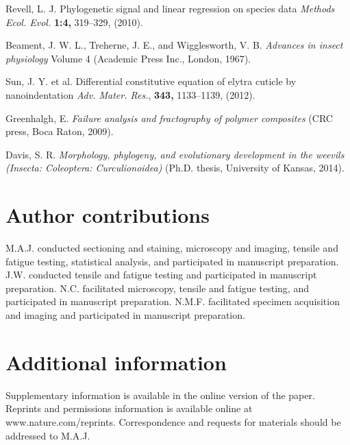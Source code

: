 \documentclass[twocolumn, linenumbers, superscriptaddress, nofootinbib]{revtex4-1}
\begin{document}
\begin{thebibliography}{50}
				Revell, L. J.
				Phylogenetic signal and linear regression on species data
				\textit{Methods Ecol. Evol.}
				\textbf{1:4,}
				319--329,
				(2010).
			
				Beament, J. W. L., Treherne, J. E., and Wigglesworth, V. B.
				\textit{Advances in insect physiology}
				Volume 4
				(Academic Press Inc.,
				London,
				1967).
			
				Sun, J. Y. et al.
				Differential constitutive equation of elytra cuticle by nanoindentation
				\textit{Adv. Mater. Res.},
				\textbf{343,}
				1133--1139,
				(2012).
			
				Greenhalgh, E.
				\textit{Failure analysis and fractography of polymer composites}
				(CRC press,
				Boca Raton,
				2009).
				
				Davis, S. R.
				\textit{Morphology, phylogeny, and evolutionary development in the	weevils (Insecta: Coleoptera: Curculionoidea)}
				(Ph.D. thesis,
				University of	Kansas,
				2014).
	\end{thebibliography}

	\begin{acknowledgements}
	\end{acknowledgements}

	\section*{Author contributions}
		M.A.J. conducted sectioning and staining, microscopy and imaging, tensile and fatigue testing, statistical analysis, and participated in manuscript preparation.
		J.W. conducted tensile and fatigue testing and participated in manuscript preparation.
		N.C. facilitated microscopy, tensile and fatigue testing, and participated in manuscript preparation.
		N.M.F. facilitated specimen acquisition and imaging and participated in manuscript preparation.
	
	\section*{Additional information}
		Supplementary information is available in the online version of the paper.
		Reprints and permissions information is available online at www.nature.com/reprints.
		Correspondence and requests for materials should be addressed to M.A.J.
	
\end{document}
